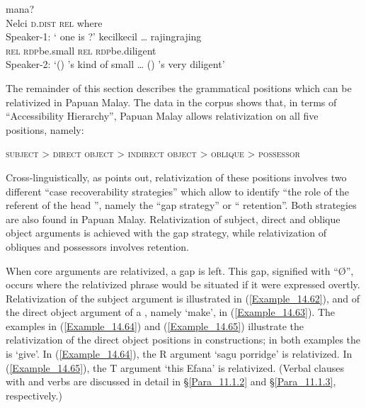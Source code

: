 \ea
\label{Example_14.61}
\ea
\label{Example_14.61a}
 {} {} {} {mana?}\\ %
  {}   Nelci  \textsc{d.dist}  \textsc{rel}  where\\
\glt Speaker-1: ‘ one is  ?’
\vspace{10pt}
\ex
\label{Example_14.61b} 
  {}    kecil{\Tilde}kecil  {\ldots}  {}    rajing{\Tilde}rajing\\
      {} {} \textsc{rel}  \textsc{rdp}{\Tilde}be.small  {} {}    \textsc{rel}  \textsc{rdp}{\Tilde}be.diligent\\
\glt Speaker-2: ‘() ’s kind of small {\ldots} () ’s very diligent’ \textstyleExampleSource{[081115-001a-Cv.0285-0292]}
\z
\z

The remainder of this section describes the grammatical positions which can be relativized in Papuan Malay. The data in the corpus shows that, in terms of   ``Accessibility Hierarchy'', Papuan Malay allows relativization on all five positions, namely:

\begin{center}
\textsc{subject} {\textgreater} \textsc{direct} \textsc{object} {\textgreater} \textsc{indirect} \textsc{object} {\textgreater} \textsc{oblique} {\textgreater} \textsc{possessor}
\end{center}

Cross-linguistically, as \citet[297, 298]{Payne.1997} points out, relativization of these positions involves two different “case recoverability strategies” which allow to identify “the role of the referent of the head  ”, namely the “gap strategy” or “ retention”. Both strategies are also found in Papuan Malay. Relativization of subject, direct and oblique object arguments is achieved with the gap strategy, while relativization of obliques and possessors involves  retention.

When core arguments are relativized, a gap is left. This gap, signified with ``Ø'', occurs where the relativized  phrase would be situated if it were expressed overtly. Relativization of the subject argument is illustrated in (\ref{Example_14.62}), and of the direct object argument of a  , namely  ‘make’, in (\ref{Example_14.63}). The examples in (\ref{Example_14.64}) and (\ref{Example_14.65}) illustrate the relativization of the direct object positions in  constructions; in both examples the   is  ‘give’. In (\ref{Example_14.64}), the R argument  ‘sagu porridge’ is relativized. In (\ref{Example_14.65}), the T argument  ‘this Efana’ is relativized. (Verbal clauses with  and  verbs are discussed in detail in §\ref{Para_11.1.2} and §\ref{Para_11.1.3}, respectively.)
%


